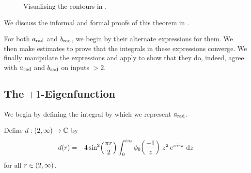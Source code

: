 \begin{wrapfigure}[7]{r}{0.4\linewidth}
    \vspace{-0.7em}
    \centering
    \caption{Visualising the contours in .}  
\end{wrapfigure}

We discuss the informal and formal proofs of this theorem in .

For both $a_{\operatorname{rad}}$ and $b_{\operatorname{rad}}$, we begin by their alternate expressions for them. We then make estimates to prove that the integrals in these expressions converge. We finally manipulate the expressions and apply  to show that they do, indeed, agree with $a_{\operatorname{rad}}$ and $b_{\operatorname{rad}}$ on inputs $> 2$.

\subsection{The $+1$-Eigenfunction}

We begin by defining the integral by which we represent $a_{\operatorname{rad}}$.

\begin{boxdefinition}
    Define $d : \left( 2, \infty \right) \to \mathbb{C}$ by
    \begin{align*}
        d\!\left( r \right) = -4 \sin^2\!\left( \frac{\pi r}{2} \right) \int_{0}^{i\infty} \phi_0\!\left( \frac{-1}{z} \right) \, z^2 \, e^{\pi i r z} \, \operatorname{d}\!{z}
    \end{align*}
    for all $r \in \left( 2, \infty \right)$.
\end{boxdefinition}

